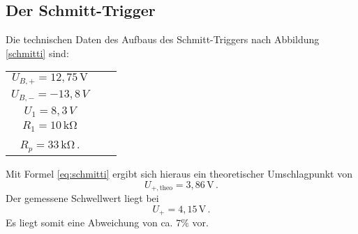\subsection{Der Schmitt-Trigger}
Die technischen Daten des Aufbaus des Schmitt-Triggers nach Abbildung \ref{schmitti} sind:
\begin{table}[H]
\centering
\begin{tabular}{ccc}
$U_{B,+}=12{,}75 \,\si{\V}$ \\
$U_{B,-}=-13{,}8\,\si{V}$ \\
$U_1=8{,}3\,\si{V}$ \\
$R_1=10\,\si{\kilo\ohm}$ \\
$R_p=33\,\si{\kilo\ohm}$\,. \\
\end{tabular}
\end{table}
Mit Formel \eqref{eq:schmitti} ergibt sich hieraus ein theoretischer Umschlagpunkt von
\begin{equation}
U_{+,\text{theo}}=3{,}86\,\si{\V}\,.
\end{equation}
Der gemessene Schwellwert liegt bei
\begin{equation}
U_{+}=4{,}15\,\si{\V}\,.
\end{equation}
Es liegt somit eine Abweichung von ca. $7\%$ vor.
\clearpage
